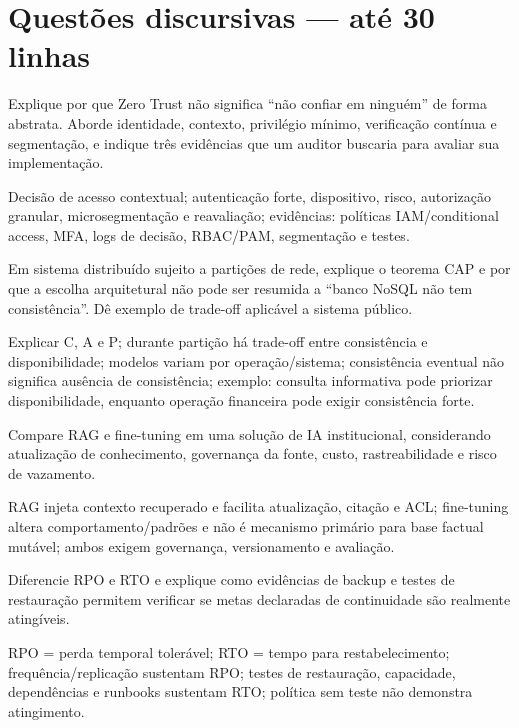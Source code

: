 \section{Questões discursivas — até 30 linhas}

\begin{discursiva}
Explique por que Zero Trust não significa ``não confiar em ninguém'' de forma abstrata. Aborde identidade, contexto, privilégio mínimo, verificação contínua e segmentação, e indique três evidências que um auditor buscaria para avaliar sua implementação.
\end{discursiva}
\begin{resumo}[Espelho Q1]Decisão de acesso contextual; autenticação forte, dispositivo, risco, autorização granular, microsegmentação e reavaliação; evidências: políticas IAM/conditional access, MFA, logs de decisão, RBAC/PAM, segmentação e testes.\end{resumo}

\begin{discursiva}
Em sistema distribuído sujeito a partições de rede, explique o teorema CAP e por que a escolha arquitetural não pode ser resumida a ``banco NoSQL não tem consistência''. Dê exemplo de trade-off aplicável a sistema público.
\end{discursiva}
\begin{resumo}[Espelho Q2]Explicar C, A e P; durante partição há trade-off entre consistência e disponibilidade; modelos variam por operação/sistema; consistência eventual não significa ausência de consistência; exemplo: consulta informativa pode priorizar disponibilidade, enquanto operação financeira pode exigir consistência forte.\end{resumo}

\begin{discursiva}
Compare RAG e fine-tuning em uma solução de IA institucional, considerando atualização de conhecimento, governança da fonte, custo, rastreabilidade e risco de vazamento.
\end{discursiva}
\begin{resumo}[Espelho Q3]RAG injeta contexto recuperado e facilita atualização, citação e ACL; fine-tuning altera comportamento/padrões e não é mecanismo primário para base factual mutável; ambos exigem governança, versionamento e avaliação.\end{resumo}

\begin{discursiva}
Diferencie RPO e RTO e explique como evidências de backup e testes de restauração permitem verificar se metas declaradas de continuidade são realmente atingíveis.
\end{discursiva}
\begin{resumo}[Espelho Q4]RPO = perda temporal tolerável; RTO = tempo para restabelecimento; frequência/replicação sustentam RPO; testes de restauração, capacidade, dependências e runbooks sustentam RTO; política sem teste não demonstra atingimento.\end{resumo}

